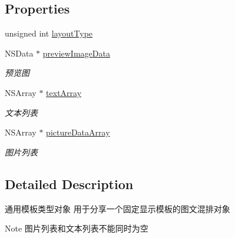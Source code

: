 \subsection*{Properties}
\begin{DoxyCompactItemize}
\item 
unsigned int \mbox{\hyperlink{interface_q_q_api_common_content_object_af0737db63274658041d8a1407057c002}{layout\+Type}}
\item 
\mbox{\label{interface_q_q_api_common_content_object_a10fb99abf109588673338e43b32c5916}} 
N\+S\+Data $\ast$ \mbox{\hyperlink{interface_q_q_api_common_content_object_a10fb99abf109588673338e43b32c5916}{preview\+Image\+Data}}
\begin{DoxyCompactList}\small\item\em 预览图 \end{DoxyCompactList}\item 
\mbox{\label{interface_q_q_api_common_content_object_a5e7f699478713f754c199312ba70131a}} 
N\+S\+Array $\ast$ \mbox{\hyperlink{interface_q_q_api_common_content_object_a5e7f699478713f754c199312ba70131a}{text\+Array}}
\begin{DoxyCompactList}\small\item\em 文本列表 \end{DoxyCompactList}\item 
\mbox{\label{interface_q_q_api_common_content_object_a32587ed4ecd053e3f84f58ec131bbc52}} 
N\+S\+Array $\ast$ \mbox{\hyperlink{interface_q_q_api_common_content_object_a32587ed4ecd053e3f84f58ec131bbc52}{picture\+Data\+Array}}
\begin{DoxyCompactList}\small\item\em 图片列表 \end{DoxyCompactList}\end{DoxyCompactItemize}


\subsection{Detailed Description}
通用模板类型对象 用于分享一个固定显示模板的图文混排对象 

\begin{DoxyNote}{Note}
图片列表和文本列表不能同时为空 
\end{DoxyNote}


